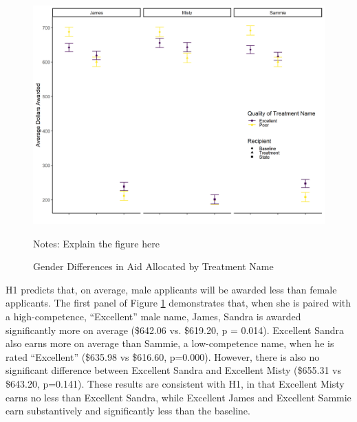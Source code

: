 \documentclass[12pt]{article}%
\begin{document}
\begin{doublespace}
\begin{figure}[h!]
	\centering
	\includegraphics[scale=.8]{figs/general-results-name.png}
	{\singlespacing
		\parbox{0.78\textwidth}{\scriptsize%
			Notes: Explain the figure here
	}}
	\caption{Gender Differences in Aid Allocated by Treatment Name}
	\label{results-main}
\end{figure}

H1 predicts that, on average, male applicants will be awarded less than female applicants. The first panel of Figure \ref{results-main} demonstrates that, when she is paired with a high-competence, ``Excellent” male name, James, Sandra is awarded significantly more on average (\$642.06 vs. \$619.20, p = 0.014). Excellent Sandra also earns more on average than Sammie, a low-competence name, when he is rated ``Excellent” (\$635.98 vs \$616.60, p=0.000). However, there is also no significant difference between Excellent Sandra and Excellent Misty (\$655.31 vs \$643.20, p=0.141). These results are consistent with H1, in that Excellent Misty earns no less than Excellent Sandra, while Excellent James and Excellent Sammie earn substantively and significantly less than the baseline.


\end{doublespace}
\end{document}
